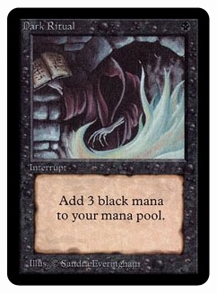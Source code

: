 \documentclass{beamer}
\begin{document}
\begin{frame}
\begin{columns}
\begin{column}{.5\textwidth}
{                    \includegraphics[width=\textwidth] {./img/dark_ritual/main.jpg}
                }
                 {
}
\end{column}
\end{columns}
\end{frame}
\end{document}
